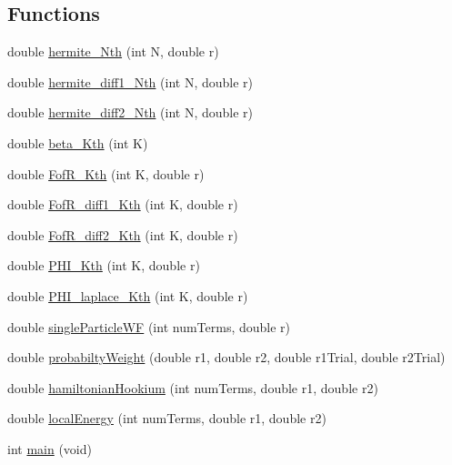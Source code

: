 \subsection*{Functions}
\begin{DoxyCompactItemize}
\item 
double \hyperlink{_hamiltonian_8_c_a99505674b3eaca3ba5e8b87d836b33d3}{hermite\-\_\-\-Nth} (int N, double r)
\item 
double \hyperlink{_hamiltonian_8_c_a7ec5cc277a531db32678aef0ece2f824}{hermite\-\_\-diff1\-\_\-\-Nth} (int N, double r)
\item 
double \hyperlink{_hamiltonian_8_c_a6793465dc0999735fe643355bad66f9c}{hermite\-\_\-diff2\-\_\-\-Nth} (int N, double r)
\item 
double \hyperlink{_hamiltonian_8_c_a55fc72b0d5d57ce3d31669436746fb4c}{beta\-\_\-\-Kth} (int K)
\item 
double \hyperlink{_hamiltonian_8_c_a3d8031037d79fc051beadafd441dcd0c}{Fof\-R\-\_\-\-Kth} (int K, double r)
\item 
double \hyperlink{_hamiltonian_8_c_a19c5936462beaa7be22d387a58f1f3c2}{Fof\-R\-\_\-diff1\-\_\-\-Kth} (int K, double r)
\item 
double \hyperlink{_hamiltonian_8_c_a2529c125e10fca386464e1bb23c81bb7}{Fof\-R\-\_\-diff2\-\_\-\-Kth} (int K, double r)
\item 
double \hyperlink{_hamiltonian_8_c_ae9b5889d7fdd0b64238fdb99de59325a}{P\-H\-I\-\_\-\-Kth} (int K, double r)
\item 
double \hyperlink{_hamiltonian_8_c_acfb28b1644fccbee065d635bd3feae69}{P\-H\-I\-\_\-laplace\-\_\-\-Kth} (int K, double r)
\item 
double \hyperlink{_hamiltonian_8_c_abaf78415afd670c31ce92ab2f4f51a5c}{single\-Particle\-W\-F} (int num\-Terms, double r)
\item 
double \hyperlink{_hamiltonian_8_c_a4f19d549d92d976fea2e9f2a2182dd33}{probabilty\-Weight} (double r1, double r2, double r1\-Trial, double r2\-Trial)
\item 
double \hyperlink{_hamiltonian_8_c_a1ea4c95b4fd14680ab8cce9432ae86ef}{hamiltonian\-Hookium} (int num\-Terms, double r1, double r2)
\item 
double \hyperlink{_hamiltonian_8_c_a1296097286a47b7bb99899a75c931733}{local\-Energy} (int num\-Terms, double r1, double r2)
\item 
int \hyperlink{_hamiltonian_8_c_a840291bc02cba5474a4cb46a9b9566fe}{main} (void)
\end{DoxyCompactItemize}
